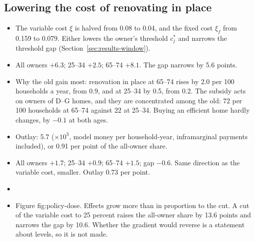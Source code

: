 \subsection{Lowering the cost of renovating in place}

\begin{itemize}
  \item {} The variable cost $\xi$ is halved from 0.08 to 0.04, and
    the fixed cost $\xi_f$ from 0.159 to 0.079. Either lowers the owner's
    threshold $c_j^*$ and narrows the threshold gap
    (Section~\ref{sec:results-window}).
\end{itemize}

\begin{itemize}
  \item {} All owners $+6.3$; 25--34 $+2.5$; 65--74 $+8.1$. The gap
    narrows by 5.6 points.
  \item {} Why the old gain most: renovation in place at 65--74
    rises by 2.0 per 100 households a year, from 0.9, and at 25--34 by 0.5,
    from 0.2. The subsidy acts on owners of D--G homes, and they are
    concentrated among the old: 72 per 100 households at 65--74 against 22
    at 25--34. Buying an efficient home hardly changes, by $-0.1$ at both
    ages.
  \item {} Outlay: 5.7 ($\times10^3$, model money per
    household-year, inframarginal payments included), or 0.91 per point of
    the all-owner share.
\end{itemize}

\begin{itemize}
  \item {} All owners $+1.7$; 25--34 $+0.9$; 65--74 $+1.5$; gap
    $-0.6$. Same direction as the variable cost, smaller. Outlay
    0.73 per point.
  \item {}
\end{itemize}

\begin{itemize}
  \item {} Figure fig:policy-dose. Effects grow more than in
    proportion to the cut. A cut of the variable cost to 25 percent raises
    the all-owner share by 13.6 points and narrows the gap by 10.6. Whether
    the gradient would reverse is a statement about levels, so it is not
    made.
\end{itemize}
\fi

